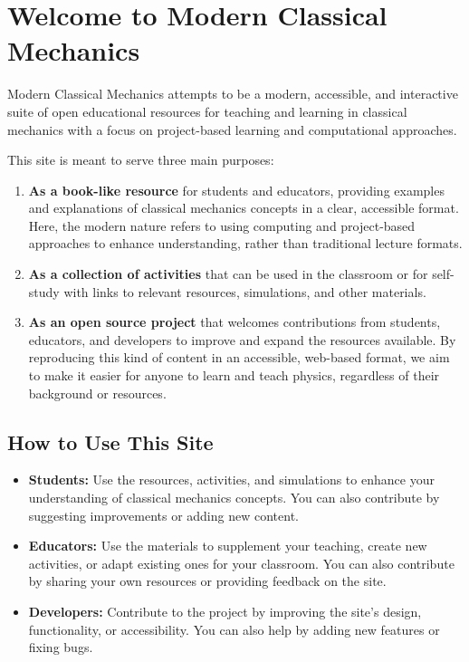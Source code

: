 \section{Welcome to Modern Classical
Mechanics}\label{welcome-to-modern-classical-mechanics}

Modern Classical Mechanics attempts to be a modern, accessible, and
interactive suite of open educational resources for teaching and
learning in classical mechanics with a focus on project-based learning
and computational approaches.

This site is meant to serve three main purposes:

\begin{enumerate}
\def\labelenumi{\arabic{enumi}.}
\tightlist
\item
  \textbf{As a book-like resource} for students and educators, providing
  examples and explanations of classical mechanics concepts in a clear,
  accessible format. Here, the modern nature refers to using computing
  and project-based approaches to enhance understanding, rather than
  traditional lecture formats.
\item
  \textbf{As a collection of activities} that can be used in the
  classroom or for self-study with links to relevant resources,
  simulations, and other materials.
\item
  \textbf{As an open source project} that welcomes contributions from
  students, educators, and developers to improve and expand the
  resources available. By reproducing this kind of content in an
  accessible, web-based format, we aim to make it easier for anyone to
  learn and teach physics, regardless of their background or resources.
\end{enumerate}

\subsection{How to Use This Site}\label{how-to-use-this-site}

\begin{itemize}
\tightlist
\item
  \textbf{Students:} Use the resources, activities, and simulations to
  enhance your understanding of classical mechanics concepts. You can
  also contribute by suggesting improvements or adding new content.
\item
  \textbf{Educators:} Use the materials to supplement your teaching,
  create new activities, or adapt existing ones for your classroom. You
  can also contribute by sharing your own resources or providing
  feedback on the site.
\item
  \textbf{Developers:} Contribute to the project by improving the site's
  design, functionality, or accessibility. You can also help by adding
  new features or fixing bugs.
\end{itemize}


